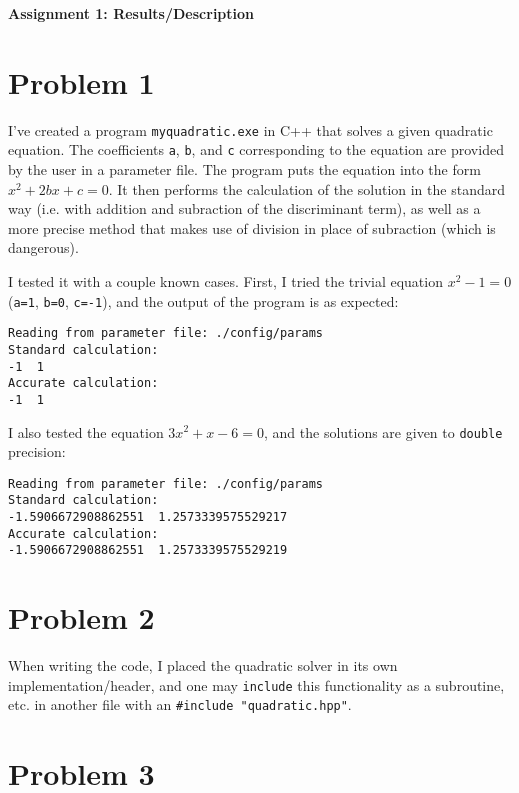\documentclass[12pt]{article}
\begin{document}
\begin{center}\begin{LARGE}
\textbf{Assignment 1: Results/Description}
\end{LARGE}\end{center}

\section*{Problem 1}

I've created a program \texttt{myquadratic.exe} in C++ that solves a given
quadratic equation. The coefficients \texttt{a}, \texttt{b}, and \texttt{c}
corresponding to the equation are provided by the user in a parameter file. The
program puts the equation into the form $x^2 + 2bx + c = 0$. It then performs
the calculation of the solution in the standard way (i.e. with addition and
subraction of the discriminant term), as well as a more precise method that
makes use of division in place of subraction (which is dangerous).

I tested it with a couple known cases. First, I tried the trivial equation
$x^2 - 1 = 0$ (\texttt{a=1}, \texttt{b=0}, \texttt{c=-1}), and the output of
the program is as expected:
\begin{verbatim}
Reading from parameter file: ./config/params
Standard calculation:
-1  1
Accurate calculation:
-1  1
\end{verbatim}

I also tested the equation $3x^2 + x - 6 = 0$, and the solutions are given to
\texttt{double} precision:
\begin{verbatim}
Reading from parameter file: ./config/params
Standard calculation:
-1.5906672908862551  1.2573339575529217
Accurate calculation:
-1.5906672908862551  1.2573339575529219
\end{verbatim}

\section*{Problem 2}

When writing the code, I placed the quadratic solver in its own
implementation/header, and one may \texttt{include} this functionality as a
subroutine, etc. in another file with an \texttt{\#include "quadratic.hpp"}.

\section*{Problem 3}
\end{document}
